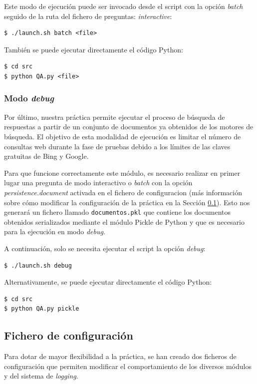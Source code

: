 \documentclass[12pt,a4paper,titlepage]{article}
\begin{document}
Este modo de ejecución puede ser invocado desde el script con la opción \emph{batch} seguido de la ruta del fichero de preguntas:
\emph{interactive}:
\begin{lstlisting}
$ ./launch.sh batch <file>
\end{lstlisting}

También se puede ejecutar directamente el código Python:
\begin{lstlisting}
$ cd src
$ python QA.py <file>
\end{lstlisting}

\subsubsection{Modo \emph{debug}}
Por último, nuestra práctica permite ejecutar el proceso de búsqueda de respuestas a partir de un conjunto de documentos ya obtenidos de los motores de búsqueda. El objetivo de esta modalidad de ejecución es limitar el número de consultas web durante la fase de pruebas debido a los límites de las claves gratuitas de Bing y Google.

Para que funcione correctamente este módulo, es necesario realizar en primer lugar una pregunta de modo interactivo o \emph{batch} con la opción \emph{persistence.document} activada en el fichero de configuracion (más información sobre cómo modificar la configuración de la práctica en la Sección \ref{section:conf}). Esto nos generará un fichero llamado \texttt{documentos.pkl} que contiene los documentos obtenidos serializados mediante el módulo Pickle de Python y que es necesario para la ejecución en modo \emph{debug}.

A continuación, solo se necesita ejecutar el script la opción \emph{debug}:
\begin{lstlisting}
$ ./launch.sh debug
\end{lstlisting}

Alternativamente, se puede ejecutar directamente el código Python:
\begin{lstlisting}
$ cd src
$ python QA.py pickle
\end{lstlisting}

\subsection{Fichero de configuración}
\label{section:conf}
Para dotar de mayor flexibilidad a la práctica, se han creado dos ficheros de configuración que permiten modificar el comportamiento de los diversos módulos y del sistema de \emph{logging}.
\end{document}
